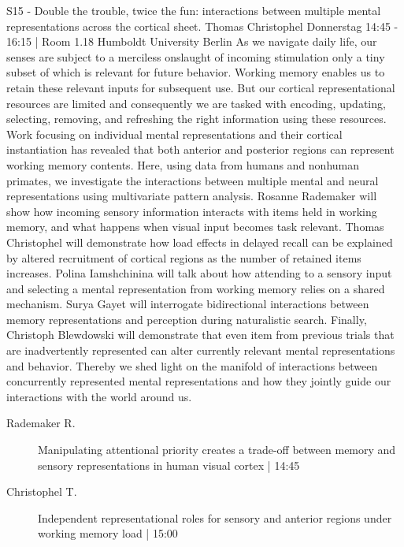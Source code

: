 
            \begin{symposium}
            {S15 - Double the trouble, twice the fun: interactions between multiple mental representations across the cortical sheet.}
            {Thomas Christophel}
            {Donnerstag 14:45 - 16:15 | Room 1.18}
            {Humboldt University Berlin}
            As we navigate daily life, our senses are subject to a merciless onslaught of incoming stimulation only a tiny subset of which is relevant for future behavior. Working memory enables us to retain these relevant inputs for subsequent use. But our cortical representational resources are limited and consequently we are tasked with encoding, updating, selecting, removing, and refreshing the right information using these resources. Work focusing on individual mental representations and their cortical instantiation has revealed that both anterior and posterior regions can represent working memory contents. Here, using data from humans and nonhuman primates, we investigate the interactions between multiple mental and neural representations using multivariate pattern analysis. Rosanne Rademaker will show how incoming sensory information interacts with items held in working memory, and what happens when visual input becomes task relevant. Thomas Christophel will demonstrate how load effects in delayed recall can be explained by altered recruitment of cortical regions as the number of retained items increases. Polina Iamshchinina will talk about how attending to a sensory input and selecting a mental representation from working memory relies on a shared mechanism. Surya Gayet will interrogate bidirectional interactions between memory representations and perception during naturalistic search. Finally, Christoph Blewdowski will demonstrate that even item from previous trials that are inadvertently represented can alter currently relevant mental representations and behavior. Thereby we shed light on the manifold of interactions between concurrently represented mental representations and how they jointly guide our interactions with the world around us.
            \begin{description}    
            
                \item [ Rademaker R.] Manipulating attentional priority creates a trade-off between memory and sensory representations in human visual cortex  \textcolor{mygray}{ | 14:45}    
                
                \item [ Christophel T.] Independent representational roles for sensory and anterior regions under working memory load  \textcolor{mygray}{ | 15:00}    
                

\end{description}
\end{symposium}

